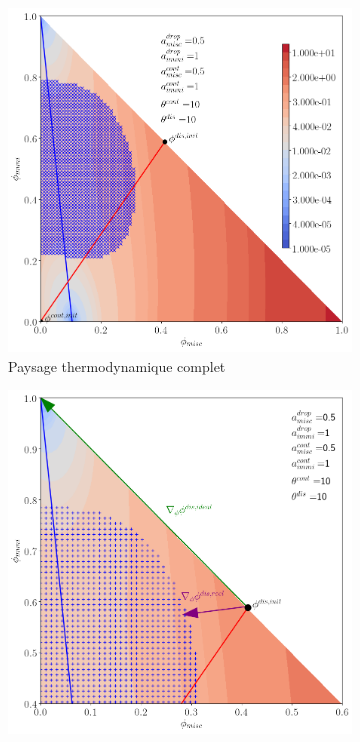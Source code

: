  \begin{figure}[H]
 	\centering
 	\begin{subfigure}[H]{0.45\textwidth}
 		\centering
 		\includegraphics[width=\textwidth]{figure/paysage_neqlocal}
 		\caption{Paysage thermodynamique complet}
 		\label{fig:y equals x}
 	\end{subfigure}
 	\hfill
 	\begin{subfigure}[H]{0.45\textwidth}
 		\centering
 		\includegraphics[width=\textwidth]{figure/direction_gradient}

\end{subfigure}
\end{figure}
